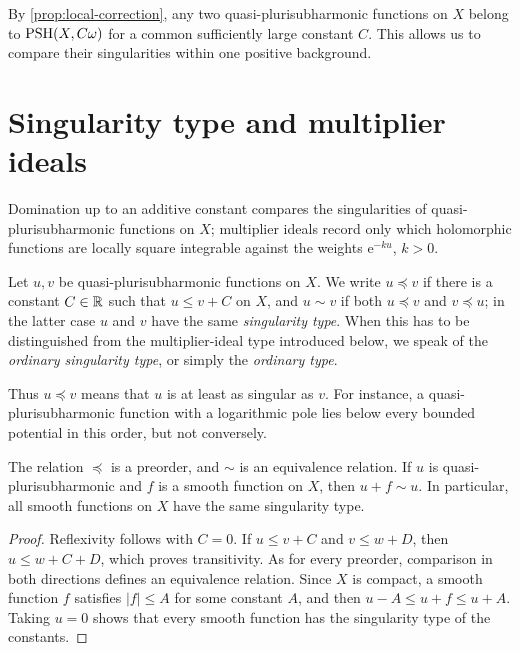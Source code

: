 By \cref{prop:local-correction}, any two quasi-plurisubharmonic functions on $X$ belong to $\mathrm{PSH}(X,C\omega)$ for a common sufficiently large constant $C$. This allows us to compare their singularities within one positive background.









\section{Singularity type and multiplier ideals}\label{sec:psh-singularity-types}

Domination up to an additive constant compares the singularities of quasi-plurisubharmonic functions on $X$; multiplier ideals record only which holomorphic functions are locally square integrable against the weights $\mathrm{e}^{-ku}$, $k>0$.

\begin{definition}\label{def:singularity-order}
Let $u,v$ be quasi-plurisubharmonic functions on $X$. We write $u\preceq v$ if there is a constant $C\in\mathbb R$ such that $u\leq v+C$ on $X$, and $u\sim v$ if both $u\preceq v$ and $v\preceq u$; in the latter case $u$ and $v$ have the same \emph{singularity type}. When this has to be distinguished from the multiplier-ideal type introduced below, we speak of the \emph{ordinary singularity type}, or simply the \emph{ordinary type}.
\end{definition}

Thus $u\preceq v$ means that $u$ is at least as singular as $v$. For instance, a quasi-plurisubharmonic function with a logarithmic pole lies below every bounded potential in this order, but not conversely.

\begin{proposition}\label{prop:singularity-elementary}
The relation $\preceq$ is a preorder, and $\sim$ is an equivalence relation. If $u$ is quasi-plurisubharmonic and $f$ is a smooth function on $X$, then $u+f\sim u$. In particular, all smooth functions on $X$ have the same singularity type.
\end{proposition}
\begin{proof}
Reflexivity follows with $C=0$. If $u\leq v+C$ and $v\leq w+D$, then $u\leq w+C+D$, which proves transitivity. As for every preorder, comparison in both directions defines an equivalence relation. Since $X$ is compact, a smooth function $f$ satisfies $|f|\leq A$ for some constant $A$, and then $u-A\leq u+f\leq u+A$. Taking $u=0$ shows that every smooth function has the singularity type of the constants.
\end{proof}

